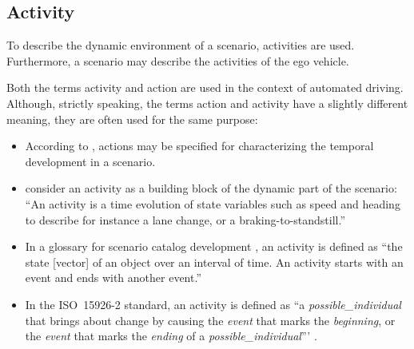 


\subsection{Activity}
\label{sec:activity}

To describe the dynamic environment of a scenario, activities are used. Furthermore, a scenario may describe the activities of the ego vehicle. 

Both the terms activity \autocite{geyer2014, elrofai2018scenario, childress2015using, catapult2018musicc, sigsim2019glossary} and action \autocite{geyer2014, ulbrich2015, bagschik2017ontology} are used in the context of automated driving. Although, strictly speaking, the terms action and activity have a slightly different meaning, they are often used for the same purpose:
\begin{itemize}
	\item According to \textcite{ulbrich2015}, actions may be specified for characterizing the temporal development in a scenario.
	\item \textcite{elrofai2018scenario} consider an activity as a building block of the dynamic part of the scenario: ``An activity is a time evolution of state variables such as speed and heading to describe for instance a lane change, or a braking-to-standstill.''
	\item In a glossary for scenario catalog development \autocite{catapult2018musicc}, an activity is defined as ``the state [vector] of an object over an interval of time. An activity starts with an event and ends with another event.''
	\item \cstarte In the ISO~15926-2 standard, an activity is defined as ``a \textit{possible\_individual} that brings about change by causing the \textit{event} that marks the \textit{beginning}, or the \textit{event} that marks the \textit{ending} of a \textit{possible\_individual}''' \autocite{batres2007upper}. \cende
\end{itemize}


